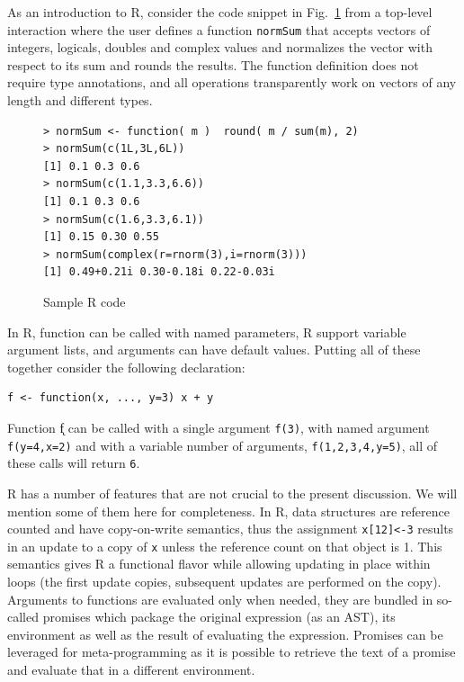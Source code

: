 \documentclass[acmsmall,10pt,review,anonymous]{acmart}\settopmatter{printfolios=true,printccs=false,printacmref=false}
\newcommand{\code}[1]{\lstinline|#1|\xspace}
\begin{document}
As an introduction to R, consider the code snippet in Fig.~\ref{sample} from
a top-level interaction where the user defines a function \code{normSum}
that accepts vectors of integers, logicals, doubles and complex values and
normalizes the vector with respect to its sum and rounds the results. The
function definition does not require type annotations, and all operations
transparently work on vectors of any length and different types.

\begin{figure}[!hb]{\small
\begin{lstlisting}[style=R]
> normSum <- function( m )  round( m / sum(m), 2)
> normSum(c(1L,3L,6L))
[1] 0.1 0.3 0.6
> normSum(c(1.1,3.3,6.6))
[1] 0.1 0.3 0.6
> normSum(c(1.6,3.3,6.1))
[1] 0.15 0.30 0.55
> normSum(complex(r=rnorm(3),i=rnorm(3)))
[1] 0.49+0.21i 0.30-0.18i 0.22-0.03i
\end{lstlisting}}
\caption{Sample R code}\label{sample}
\end{figure}

In R, function can be called with named parameters, R support variable
argument lists, and arguments can have default values. Putting all of these
together consider the following declaration:

\begin{lstlisting}[style=R]
f <- function(x, ..., y=3) x + y
\end{lstlisting}

\noindent
Function \k{f} can be called with a single argument \code{f(3)}, with named
argument \code{f(y=4,x=2)} and with a variable number of arguments,
\code{f(1,2,3,4,y=5)}, all of these calls will return \code{6}.

R has a number of features that are not crucial to the present
discussion. We will mention some of them here for completeness.  In R, data
structures are reference counted and have copy-on-write semantics, thus the
assignment \code{x[12]<-3} results in an update to a copy of \code{x} unless
the reference count on that object is 1.  This semantics gives R a
functional flavor while allowing updating in place within loops (the first
update copies, subsequent updates are performed on the copy). Arguments to
functions are evaluated only when needed, they are bundled in so-called
promises which package the original expression (as an AST), its environment
as well as the result of evaluating the expression. Promises can be
leveraged for meta-programming as it is possible to retrieve the text of a
promise and evaluate that in a different environment.
\end{document}
